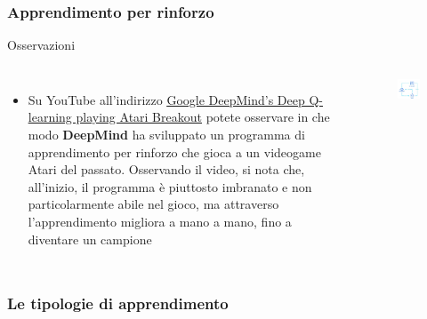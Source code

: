 {\begin{frame}
	\end{frame}
	
	
	\begin{frame}
	
		\frametitle{Apprendimento per rinforzo}
	
		\begin{block}{Osservazioni}
	
			\begin{columns}
	
				\begin{itemize}
					\item Su YouTube all'indirizzo \href{https://www.youtube.com/watch?v=V1eYniJ0Rnk}{\underline{Google DeepMind's Deep Q-learning playing Atari Breakout}} potete osservare in che modo \textbf{DeepMind} ha sviluppato un programma di apprendimento per rinforzo che gioca a un videogame Atari del passato. Osservando il video, si nota che, all'inizio, il programma è piuttosto imbranato e non particolarmente abile nel gioco, ma attraverso l’apprendimento migliora a mano a mano, fino a diventare un campione
				\end{itemize}
	
				\begin{figure}[!htbp]
					\centering
					\includegraphics[width=5cm]{images/glossary/reinforcement_learning.png}
				\end{figure}
	
			\end{columns}
	
		\end{block}
	
	\end{frame}


	\begin{frame}
	
		\frametitle{Le tipologie di apprendimento}
	

\end{frame}}
